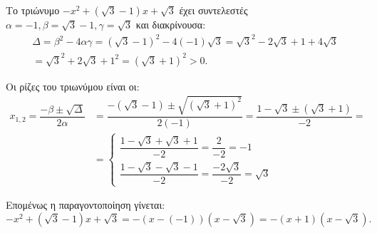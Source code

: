 
\begin{alist}
\item Το τριώνυμο $-x^2 + (\sqrt{3} - 1)x + \sqrt{3}$ έχει συντελεστές $\alpha = -1, \beta = \sqrt{3} - 1, \gamma = \sqrt{3}$ και διακρίνουσα:
\begin{gather*}
\Delta = \beta^2 - 4\alpha\gamma = (\sqrt{3} - 1)^2 - 4(-1)\sqrt{3} = \sqrt{3}^2 - 2\sqrt{3} + 1 + 4\sqrt{3} \\
= \sqrt{3}^2 + 2\sqrt{3} + 1^2 = (\sqrt{3} + 1)^2 > 0.
\end{gather*}

\item Οι ρίζες του τριωνύμου είναι οι:
\begin{align*}
x_{1,2} = \dfrac{-\beta \pm \sqrt{\Delta}}{2\alpha} &= \dfrac{-(\sqrt{3} - 1) \pm \sqrt{(\sqrt{3} + 1)^2}}{2(-1)} = \dfrac{1 - \sqrt{3} \pm (\sqrt{3} + 1)}{-2} =\\&= \begin{cases} \dfrac{1 - \sqrt{3} + \sqrt{3} + 1}{-2} = \dfrac{2}{-2} = -1 \\[2ex] \dfrac{1 - \sqrt{3} - \sqrt{3} - 1}{-2} = \dfrac{-2\sqrt{3}}{-2} = \sqrt{3} \end{cases}
\end{align*}

Επομένως η παραγοντοποίηση γίνεται:
\[-x^2 + (\sqrt{3} - 1)x + \sqrt{3} = -(x - (-1))(x - \sqrt{3}) = -(x + 1)(x - \sqrt{3}).\]
\end{alist}

